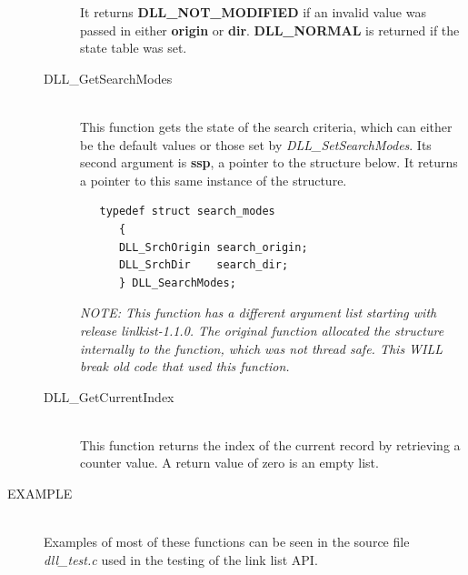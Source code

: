 \documentclass[10pt,letterpaper,titlepage]{article}
\begin{document}
\begin{description}
\begin{description}
 It returns \textbf{DLL\_NOT\_MODIFIED} if an invalid value was passed in either \textbf{origin} or \textbf{dir}.  \textbf{DLL\_NORMAL} is returned if the state table was set.

 \item[DLL\_GetSearchModes]\quad\\
 This function gets the state of the search criteria, which can either be the default values or those set by \emph{DLL\_SetSearchModes}.  Its second argument is \textbf{ssp}, a pointer to the structure below.  It returns a pointer to this same instance of the structure.

 \begin{verbatim}
   typedef struct search_modes
      {
      DLL_SrchOrigin search_origin;
      DLL_SrchDir    search_dir;
      } DLL_SearchModes;
 \end{verbatim}

\emph{NOTE: This function has a different argument list starting with release linlkist-1.1.0.  The original function allocated the structure internally to the function, which was not thread safe.  This WILL break old code that used this function.}

 \item[DLL\_GetCurrentIndex]\quad\\
 This function returns the index of the current record by retrieving a counter value.  A return value of zero is an empty list.
 \end{description}

\item[EXAMPLE]\quad\\
Examples of most of these functions can be seen in the source file \emph{dll\_test.c} used in the testing of the link list API.

\end{description}
\newpage
\end{document}
